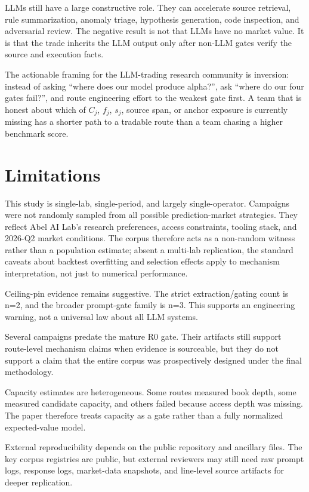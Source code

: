 \documentclass[11pt]{article}
\begin{document}
LLMs still have a large constructive role. They can accelerate source retrieval, rule summarization, anomaly triage, hypothesis generation, code inspection, and adversarial review. The negative result is not that LLMs have no market value. It is that the trade inherits the LLM output only after non-LLM gates verify the source and execution facts.

The actionable framing for the LLM-trading research community is inversion: instead of asking ``where does our model produce alpha?'', ask ``where do our four gates fail?'', and route engineering effort to the weakest gate first. A team that is honest about which of $C_j$, $f_j$, $s_j$, source span, or anchor exposure is currently missing has a shorter path to a tradable route than a team chasing a higher benchmark score.

\section{Limitations}

This study is single-lab, single-period, and largely single-operator. Campaigns were not randomly sampled from all possible prediction-market strategies. They reflect Abel AI Lab's research preferences, access constraints, tooling stack, and 2026-Q2 market conditions. The corpus therefore acts as a non-random witness rather than a population estimate; absent a multi-lab replication, the standard caveats about backtest overfitting and selection effects \citep{BaileyLopezDePrado2014} apply to mechanism interpretation, not just to numerical performance.

Ceiling-pin evidence remains suggestive. The strict extraction/gating count is n=2, and the broader prompt-gate family is n=3. This supports an engineering warning, not a universal law about all LLM systems.

Several campaigns predate the mature R0 gate. Their artifacts still support route-level mechanism claims when evidence is sourceable, but they do not support a claim that the entire corpus was prospectively designed under the final methodology.

Capacity estimates are heterogeneous. Some routes measured book depth, some measured candidate capacity, and others failed because access depth was missing. The paper therefore treats capacity as a gate rather than a fully normalized expected-value model.

External reproducibility depends on the public repository and ancillary files. The key corpus registries are public, but external reviewers may still need raw prompt logs, response logs, market-data snapshots, and line-level source artifacts for deeper replication.
\end{document}
